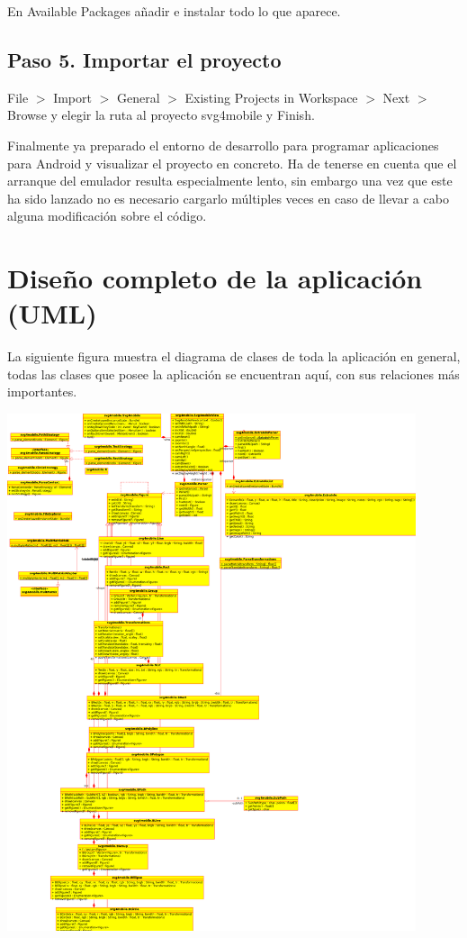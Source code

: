 \documentclass[a4paper,10pt]{article}
\begin{document}
En Available Packages añadir e instalar todo lo que aparece.

\subsection{Paso 5. Importar el proyecto}
File $>$ Import $>$ General $>$ Existing Projects in Workspace $>$ Next $>$ Browse y elegir la ruta al proyecto svg4mobile y Finish.

Finalmente ya preparado el entorno de desarrollo para programar aplicaciones para Android y visualizar el proyecto en concreto. Ha de tenerse en cuenta que el arranque del emulador resulta especialmente lento, sin embargo una vez que este ha sido lanzado no es necesario cargarlo múltiples veces en caso de llevar a cabo alguna modificación sobre el código.

\section{Diseño completo de la aplicación (UML)}

La siguiente figura muestra el diagrama de clases de toda la aplicación en general, todas las clases que posee la aplicación se encuentran aquí, con sus relaciones más importantes.

\begin{center}
 \includegraphics[width=12cm]{clases_general.png}
\end{center}
\end{document}
